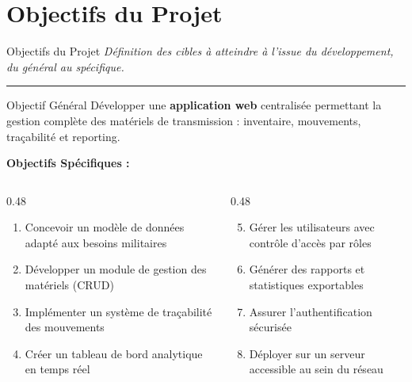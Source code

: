 \documentclass[
  aspectratio=169,       %
  xcolor=dvipsnames,     %
  t                      %
]{beamer}
\newcommand{\framedesc}[1]{%
  {\small\itshape\textcolor{PrimaryDark!80}{#1}}\par%
  \vspace{1pt}%
  {\color{PrimaryMid}\rule{\textwidth}{0.4pt}}%
  \vspace{4pt}%
}
\begin{document}
\section{Objectifs du Projet}

\begin{frame}{Objectifs du Projet}
  \framedesc{Définition des cibles à atteindre à l'issue du développement, du général au spécifique.}

  \begin{block}{Objectif Général}
    Développer une \textbf{application web} centralisée permettant la
    gestion complète des matériels de transmission : inventaire,
    mouvements, traçabilité et reporting.
  \end{block}

  \vspace{0.4cm}

  \textbf{Objectifs Spécifiques :}

  \vspace{0.2cm}

  \begin{columns}[T]
    \begin{column}{0.48\textwidth}
      \begin{enumerate}
        \item Concevoir un modèle de données adapté aux besoins militaires
        \item Développer un module de gestion des matériels (CRUD)
        \item Implémenter un système de traçabilité des mouvements
        \item Créer un tableau de bord analytique en temps réel
      \end{enumerate}
    \end{column}
    \begin{column}{0.48\textwidth}
      \begin{enumerate}
        \setcounter{enumi}{4}
        \item Gérer les utilisateurs avec contrôle d'accès par rôles
        \item Générer des rapports et statistiques exportables
        \item Assurer l'authentification sécurisée
        \item Déployer sur un serveur accessible au sein du réseau
      \end{enumerate}
    \end{column}
  \end{columns}

\end{frame}
\end{document}
